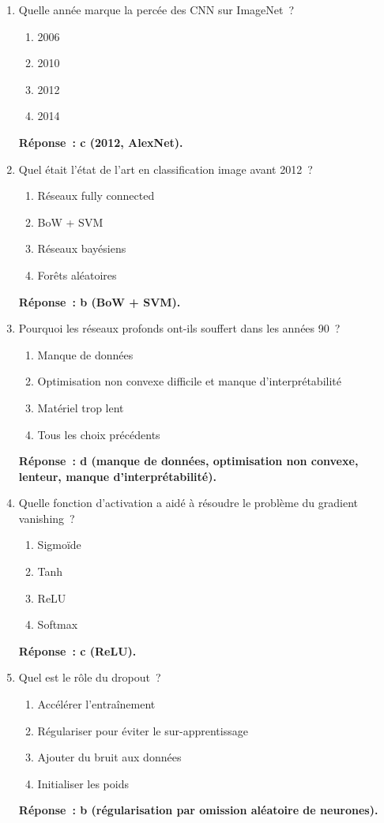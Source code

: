 \documentclass[a4paper,11pt]{article}
\theoremstyle{definition}
\theoremstyle{remark}
\begin{document}
\begin{enumerate}

  \item Quelle ann\'ee marque la perc\'ee des CNN sur ImageNet~?
    \begin{enumerate}
      \item 2006
      \item 2010
      \item 2012
      \item 2014
    \end{enumerate}
    \textbf{R\'eponse~: c (2012, AlexNet).}

  \item Quel \'etait l'\'etat de l'art en classification image
    avant 2012~?
    \begin{enumerate}
      \item R\'eseaux fully connected
      \item BoW + SVM
      \item R\'eseaux bay\'esiens
      \item For\^ets al\'eatoires
    \end{enumerate}
    \textbf{R\'eponse~: b (BoW + SVM).}

  \item Pourquoi les r\'eseaux profonds ont-ils souffert dans les
    ann\'ees 90~?
    \begin{enumerate}
      \item Manque de donn\'ees
      \item Optimisation non convexe difficile et manque
        d'interpr\'etabilit\'e
      \item Mat\'eriel trop lent
      \item Tous les choix pr\'ec\'edents
    \end{enumerate}
    \textbf{R\'eponse~: d (manque de donn\'ees, optimisation non
    convexe, lenteur, manque d'interpr\'etabilit\'e).}

  \item Quelle fonction d'activation a aid\'e \`a r\'esoudre le
    probl\`eme du gradient vanishing~?
    \begin{enumerate}
      \item Sigmo\"ide
      \item Tanh
      \item ReLU
      \item Softmax
    \end{enumerate}
    \textbf{R\'eponse~: c (ReLU).}

  \item Quel est le r\^ole du dropout~?
    \begin{enumerate}
      \item Acc\'el\'erer l'entra\^inement
      \item R\'egulariser pour \'eviter le sur-apprentissage
      \item Ajouter du bruit aux donn\'ees
      \item Initialiser les poids
    \end{enumerate}
    \textbf{R\'eponse~: b (r\'egularisation par omission al\'eatoire
    de neurones).}


\end{enumerate}
\end{document}

